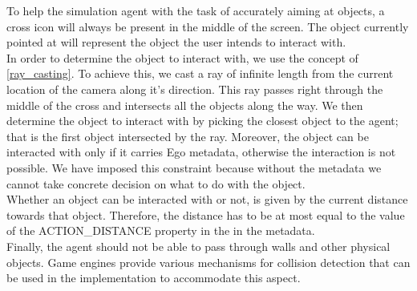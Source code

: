 To help the simulation agent with the task of accurately aiming at objects, a cross icon will always be present in the middle of the screen. The object currently pointed at will represent the object the user intends to interact with.\\

In order to determine the object to interact with, we use the concept of \ref{ray_casting}. To achieve this, we cast a ray of infinite length from the current location of the camera along it's direction. This ray passes right through the middle of the cross and intersects all the objects along the way. We then determine the object to interact with by picking the closest object to the agent; that is the first object intersected by the ray. Moreover, the object can be interacted with only if it carries Ego metadata, otherwise the interaction is not possible. We have imposed this constraint because without the metadata we cannot take concrete decision on what to do with the object.\\

Whether an object can be interacted with or not, is given by the current distance towards that object. Therefore, the distance has to be at most equal to the value of the ACTION\_DISTANCE property in the in the metadata.\\

Finally, the agent should not be able to pass through walls and other physical objects. Game engines provide various mechanisms for collision detection that can be used in the implementation to accommodate this aspect.\\
